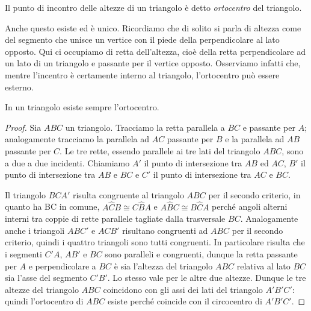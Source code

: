 \begin{definizione}
Il punto di incontro delle altezze di un triangolo è detto 
\emph{ortocentro} del triangolo.
\end{definizione}

Anche questo esiste ed è unico. Ricordiamo che di solito si parla di 
altezza come del segmento che unisce un vertice con il piede della 
perpendicolare al lato opposto. Qui ci occupiamo di retta 
dell'altezza, cioè della retta perpendicolare ad un lato di un 
triangolo e passante per il vertice opposto. Osserviamo infatti che, 
mentre l'incentro è certamente interno al triangolo, l'ortocentro può 
essere esterno.

\begin{teorema}
In un triangolo esiste sempre l'ortocentro.
\end{teorema}


\begin{inaccessibleblock}
 \begin{figure}[htb]
	\centering
\end{figure}
\end{inaccessibleblock}

\begin{proof}
Sia \(ABC\) un triangolo. Tracciamo la retta parallela a \(BC\) e 
passante per \(A\); analogamente tracciamo la parallela ad \(AC\) passante 
per \(B\) e la parallela ad \(AB\) passante per \(C\). Le tre rette, 
essendo parallele ai tre lati del triangolo \(ABC\), sono a due a due 
incidenti. Chiamiamo \(A'\) il punto di intersezione tra \(AB\) ed \(AC\), 
\(B'\) il punto di intersezione tra \(AB\) e \(BC\) e \(C'\) il punto di 
intersezione tra \(AC\) e \(BC\).

Il triangolo \(BCA'\) risulta congruente al triangolo \(ABC\) per il 
secondo criterio, in quanto ha BC in comune, \(A\widehat{C}B\cong 
C\widehat{B}A\) e \(A\widehat{B}C\cong B\widehat{C}A\) perché angoli 
alterni interni tra coppie di rette parallele tagliate dalla 
trasversale \(BC\). Analogamente anche i triangoli \(ABC'\) e \(ACB'\) 
risultano congruenti ad \(ABC\) per il secondo criterio, quindi i 
quattro triangoli sono tutti congruenti. In particolare risulta che i 
segmenti \(C'A\), \(AB'\) e \(BC\) sono paralleli e congruenti, dunque la 
retta passante per \(A\) e perpendicolare a \(BC\) è sia l'altezza del 
triangolo \(ABC\) relativa al lato \(BC\) sia l'asse del segmento \(C'B'\). 
Lo stesso vale per le altre due altezze. Dunque le tre altezze del 
triangolo \(ABC\) coincidono con gli assi dei lati del triangolo 
\(A'B'C'\): quindi l'ortocentro di \(ABC\) esiste perché coincide con il 
circocentro di \(A'B'C'\).
\end{proof}

